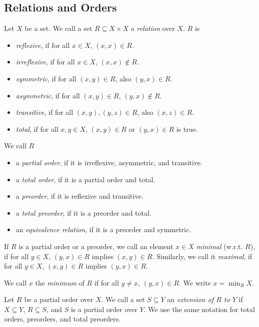 \subsection{Relations and Orders}
\begin{defn}
	Let $X$ be a set. We call a set $R \subseteq X \times X$ a \emph{relation} over $X$. $R$ is
	\begin{itemize}
		\item \emph{reflexive}, if for all $x \in X$, $(x, x) \in R$.
		\item \emph{irreflexive}, if for all $x \in X$, $(x, x) \notin R$.
		\item \emph{symmetric}, if for all $(x, y) \in R$, also $(y, x) \in R$.
		\item \emph{asymmetric}, if for all $(x, y) \in R$, $(y, x) \notin R$.
		\item \emph{transitive}, if for all $(x, y), (y, z) \in R$, also $(x, z) \in R$.
		\item \emph{total}, if for all $x, y \in X$, $(x, y) \in R$ or $(y, x) \in R$ is true.
	\end{itemize}
	
	We call $R$ 
	\begin{itemize}
		\item a \emph{partial order}, if it is irreflexive, asymmetric, and transitive.
		\item a \emph{total order}, if it is a partial order and total.
		\item a \emph{preorder}, if it is reflexive and transitive.
		\item a \emph{total preorder}, if it is a preorder and total.
		\item an \emph{equivalence relation}, if it is a preorder and symmetric.
	\end{itemize}
	
	If $R$ is a partial order or a preorder, we call an element $x \in X$ \emph{minimal} (w.r.t. $R$), if for all $y \in X$, $(y, x) \in R$ implies $(x, y) \in R$. Similarly, we call it \emph{maximal}, if for all $y \in X$, $(x, y) \in R$ implies $(y, x) \in R$. 
	
	We call $x$ the \emph{minimum} of $R$ if for all $y \neq x$, $(y, x) \in R$. We write $x = \min_R X$.
\end{defn}

\begin{defn}
	Let $R$ be a partial order over $X$. We call a set $S \subseteq Y$ an \emph{extension of $R$ to $Y$} if $X \subseteq Y$, $R \subseteq S$, and $S$ is a partial order over $Y$. We use the same notation for total orders, preorders, and total preorders.
\end{defn}

